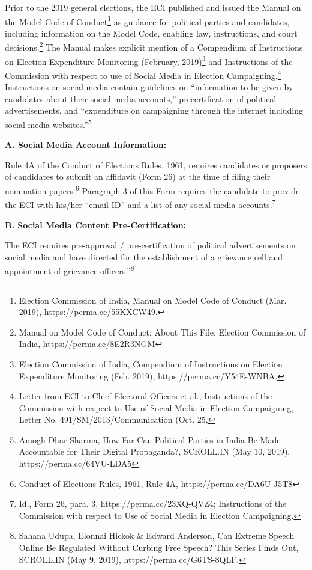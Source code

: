 \begin{multicols}{2}
\noi
Prior to the 2019 general elections, the ECI published and issued the Manual on the Model
Code of Conduct\footnote{Election Commission of India, Manual on Model Code of Conduct (Mar. 2019), https://perma.cc/55KXCW49.} as guidance for political parties and candidates, including information on
the Model Code, enabling law, instructions, and court decisions.\footnote{Manual on Model Code of Conduct: About This File, Election Commission of India, https://perma.cc/8E2R3NGM} The Manual makes explicit mention of a Compendium of Instructions on Election Expenditure Monitoring (February,
2019)\footnote{Election Commission of India, Compendium of Instructions on Election Expenditure Monitoring (Feb.
2019), https://perma.cc/Y54E-WNBA.} and Instructions of the Commission with respect to use of Social Media in Election
Campaigning.\footnote{Letter from ECI to Chief Electoral Officers et al., Instructions of the Commission with respect to Use of
Social Media in Election Campaigning, Letter No. 491/SM/2013/Communication (Oct. 25,} Instructions on social media contain guidelines on “information to be given by candidates about their social media accounts,” precertification of political advertisements,
and “expenditure on campaigning through the internet including social media websites.”\footnote{Amogh Dhar Sharma, How Far Can Political Parties in India Be Made Accountable for Their Digital Propaganda?, SCROLL.IN (May 10, 2019), https://perma.cc/64VU-LDA5 }

\noi
{\large\bfseries A. Social Media Account Information:}

\noi
Rule 4A of the Conduct of Elections Rules, 1961, requires candidates or proposers of
candidates to submit an affidavit (Form 26) at the time of filing their nomination
papers.\footnote{Conduct of Elections Rules, 1961, Rule 4A, https://perma.cc/DA6U-J5T8 } Paragraph 3 of this Form requires the candidate to provide the ECI with his/her “email ID” and a list of any social media accounts.\footnote{Id., Form 26, para. 3, https://perma.cc/23XQ-QVZ4; Instructions of the Commission with respect to Use of Social Media in Election Campaigning.}

\noi
{\large\bfseries B. Social Media Content Pre-Certification:}

\noi
The ECI requires pre-approval / pre-certification of political advertisements on social media
and have directed for the establishment of a grievance cell and appointment of grievance
officers.”\footnote{Sahana Udupa, Elonnai Hickok & Edward Anderson, Can Extreme Speech Online Be Regulated Without
Curbing Free Speech? This Series Finds Out, SCROLL.IN (May 9, 2019), https://perma.cc/G6TS-8QLF.}


\end{multicols}
